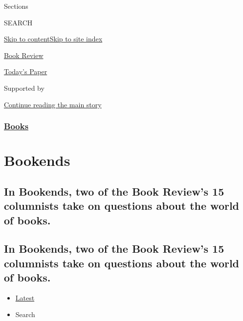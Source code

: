 Sections

SEARCH

\protect\hyperlink{site-content}{Skip to
content}\protect\hyperlink{site-index}{Skip to site index}

\href{https://www.nytimes.com/section/books/review}{Book Review}

\href{https://myaccount.nytimes.com/auth/login?response_type=cookie\&client_id=vi}{}

\href{https://www.nytimes.com/section/todayspaper}{Today's Paper}

Supported by

\protect\hyperlink{after-sponsor}{Continue reading the main story}

\hypertarget{books}{%
\subsubsection{\texorpdfstring{\href{/section/books}{Books}}{Books}}\label{books}}

\hypertarget{bookends}{%
\section{Bookends}\label{bookends}}

\hypertarget{in-bookends-two-of-the-book-reviews-15-columnists-take-on-questions-about-the-world-of-books}{%
\subsection{In Bookends, two of the Book Review's 15 columnists take on
questions about the world of
books.}\label{in-bookends-two-of-the-book-reviews-15-columnists-take-on-questions-about-the-world-of-books}}

\hypertarget{in-bookends-two-of-the-book-reviews-15-columnists-take-on-questions-about-the-world-of-books-1}{%
\subsection{In Bookends, two of the Book Review's 15 columnists take on
questions about the world of
books.}\label{in-bookends-two-of-the-book-reviews-15-columnists-take-on-questions-about-the-world-of-books-1}}

\begin{itemize}
\tightlist
\item
  \protect\hyperlink{stream-panel}{Latest}
\item
  Search
\end{itemize}

